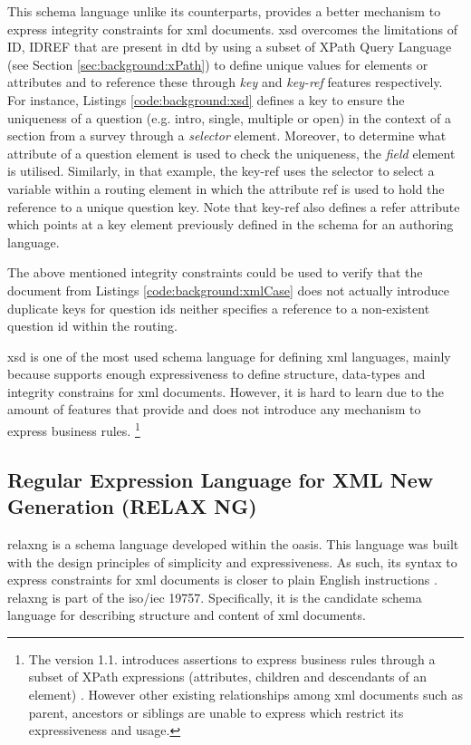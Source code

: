 	This schema language unlike its counterparts, provides a better mechanism to express integrity constraints for \gls{xml} documents. \gls{xsd} overcomes the limitations of ID, IDREF that are present in \gls{dtd} by using a subset of XPath Query Language (see Section \ref{sec:background:xPath}) to define unique values for elements or attributes and to reference these through \emph{key} and \emph{key-ref} features respectively. For instance, Listings \ref{code:background:xsd} defines a key to ensure the uniqueness of a question (e.g. intro, single, multiple or open) in the context of a section from a survey through a \emph{selector} element. Moreover, to determine what attribute of a question element is used to check the uniqueness, the \emph{field} element is utilised. Similarly, in that example, the key-ref uses the selector to select a variable within a routing element in which the attribute ref is used to hold the reference to a unique question key. Note that key-ref also defines a refer attribute which points at a key element previously defined in the schema for an authoring language.

	

	The above mentioned integrity constraints could be used to verify that the document from Listings \ref{code:background:xmlCase} does not actually introduce duplicate keys for question ids neither specifies a reference to a non-existent question id within the routing. 

	\gls{xsd} is one of the most used schema language for defining \gls{xml} languages, mainly because supports enough expressiveness to define structure, data-types and integrity constrains for \gls{xml} documents. However, it is hard to learn due to the amount of features that provide and does not introduce any mechanism to express business rules. \footnote{The version 1.1. introduces assertions to express business rules through a subset of XPath expressions (attributes, children and descendants of an element) \cite{web:w3cxsdassertion}. However other existing relationships among \gls{xml} documents such as parent, ancestors or siblings are unable to express which restrict its expressiveness and usage.}

	\subsection{Regular Expression Language for XML New Generation (RELAX NG)}\label{sec:background:relaxNg}
	\gls{relaxng} is a schema language developed within the \gls{oasis}. This language was built with the design principles of simplicity and expressiveness. As such, its syntax to express constraints for \gls{xml} documents is closer to plain English instructions \cite{book:vandervlist03}. \gls{relaxng} is part of the \gls{iso}/\gls{iec} 19757. Specifically, it is the candidate schema language for describing structure and content of \gls{xml} documents. 

